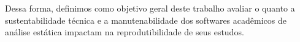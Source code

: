 
Dessa forma, definimos como objetivo geral deste trabalho avaliar o quanto a
sustentabilidade técnica e a manutenabilidade dos softwares acadêmicos de
análise estática impactam na reprodutibilidade de seus estudos.

